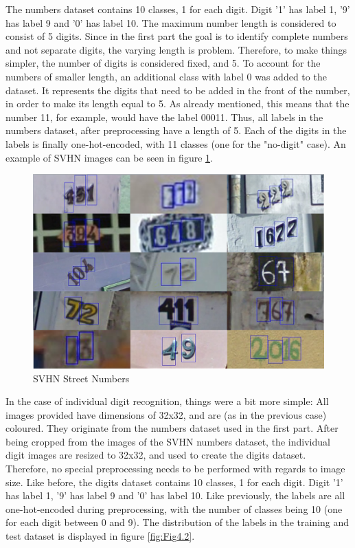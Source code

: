 \documentclass[final,12p,times]{elsarticle}
\begin{document}
The numbers dataset contains 10 classes, 1 for each digit. 
Digit '1' has label 1, '9' has label 9 and '0' has label 10.
The maximum number length is considered to consist of 5 digits. 
Since in the first part the goal is to identify complete numbers and not separate digits, the varying length is problem.
Therefore, to make things simpler, the number of digits is considered fixed, and 5. 
To account for the numbers of smaller length, an additional class with label 0 was added to the dataset. 
It represents the digits that need to be added in the front of the number, in order to make its length equal to 5.
As already mentioned, this means that the number 11, for example, would have the label 00011.
Thus, all labels in the numbers dataset, after preprocessing have a length of 5.
Each of the digits in the labels is finally  one-hot-encoded, with 11 classes (one for the "no-digit" case).
An example of SVHN images can be seen in figure \ref{fig:Fig4.1}.

\begin{figure}[H]
  \includegraphics[width=1.0\textwidth, center]{svhn_numbers.png}
  \caption{SVHN Street Numbers}
  \label{fig:Fig4.1}
  \end{figure}
  
In the case of individual digit recognition, things were a bit more simple:
All images provided have dimensions of 32x32, and are (as in the previous case) coloured.
They originate from the numbers dataset used in the first part.
After being cropped from the images of the SVHN numbers dataset, the individual digit images are resized to 32x32, and used to 
create the digits dataset.
Therefore, no special preprocessing needs to be performed with regards to image size.
Like before, the digits dataset contains 10 classes, 1 for each digit. 
Digit '1' has label 1, '9' has label 9 and '0' has label 10.
Like previously, the labels are all one-hot-encoded during preprocessing, with the number of classes being 10 (one for each 
digit between 0 and 9). 
The distribution of the labels in the training and test dataset is displayed in figure \ref{fig:Fig4.2}.
\end{document}
